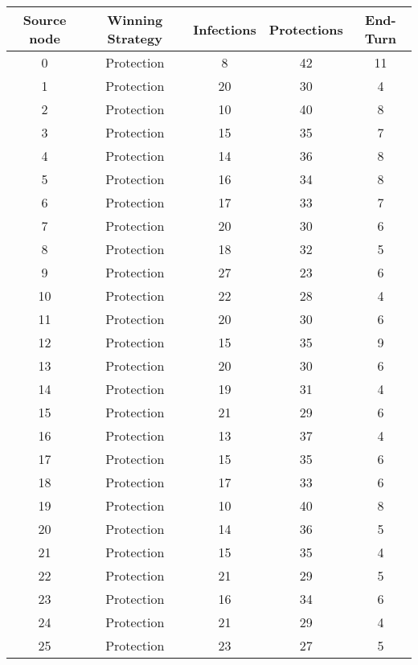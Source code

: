 \documentclass[results.tex]{subfiles}
\begin{document}
\begin{center}
  \begin{tabular}{| c || c | c | c | c |}
    \hline
    {\bfseries Source node} & {\bfseries Winning Strategy} & {\bfseries Infections} & {\bfseries Protections} & {\bfseries End-Turn} \\  %
    \hline\hline
    0 & Protection & 8 & 42 & 11 \\ 
    \hline
    1 & Protection & 20 & 30 & 4 \\ 
    \hline
    2 & Protection & 10 & 40 & 8 \\ 
    \hline
    3 & Protection & 15 & 35 & 7 \\ 
    \hline
    4 & Protection & 14 & 36 & 8 \\ 
    \hline
    5 & Protection & 16 & 34 & 8 \\ 
    \hline
    6 & Protection & 17 & 33 & 7 \\ 
    \hline
    7 & Protection & 20 & 30 & 6 \\ 
    \hline
    8 & Protection & 18 & 32 & 5 \\ 
    \hline
    9 & Protection & 27 & 23 & 6 \\ 
    \hline
    10 & Protection & 22 & 28 & 4 \\ 
    \hline
    11 & Protection & 20 & 30 & 6 \\ 
    \hline
    12 & Protection & 15 & 35 & 9 \\ 
    \hline
    13 & Protection & 20 & 30 & 6 \\ 
    \hline
    14 & Protection & 19 & 31 & 4 \\ 
    \hline
    15 & Protection & 21 & 29 & 6 \\ 
    \hline
    16 & Protection & 13 & 37 & 4 \\ 
    \hline
    17 & Protection & 15 & 35 & 6 \\ 
    \hline
    18 & Protection & 17 & 33 & 6 \\ 
    \hline
    19 & Protection & 10 & 40 & 8 \\ 
    \hline
    20 & Protection & 14 & 36 & 5 \\ 
    \hline
    21 & Protection & 15 & 35 & 4 \\ 
    \hline
    22 & Protection & 21 & 29 & 5 \\ 
    \hline
    23 & Protection & 16 & 34 & 6 \\ 
    \hline
    24 & Protection & 21 & 29 & 4 \\ 
    \hline
    25 & Protection & 23 & 27 & 5 \\ 

\end{tabular}
\end{center}
\end{document}
